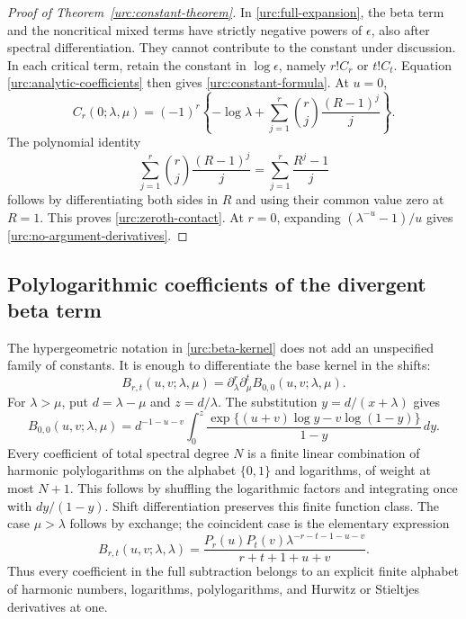\begin{proof}[Proof of Theorem~\ref{urc:constant-theorem}]
In \eqref{urc:full-expansion}, the beta term and the noncritical
mixed terms have strictly negative powers of $\epsilon$, also
after spectral differentiation. They cannot contribute to the
constant under discussion. In each critical term, retain the
constant in $\log\epsilon$, namely $r!C_r$ or $t!C_t$.
Equation \eqref{urc:analytic-coefficients} then gives
\eqref{urc:constant-formula}. At $u=0$,
\[
 C_r(0;\lambda,\mu)=(-1)^r\left\{-\log\lambda+
       \sum_{j=1}^r\binom rj\frac{(R-1)^j}{j}\right\}.
\]
The polynomial identity
\[
 \sum_{j=1}^r\binom rj\frac{(R-1)^j}{j}
       =\sum_{j=1}^r\frac{R^j-1}{j}
\]
follows by differentiating both sides in $R$ and using their common
value zero at $R=1$. This proves \eqref{urc:zeroth-contact}.
At $r=0$, expanding $(\lambda^{-u}-1)/u$ gives
\eqref{urc:no-argument-derivatives}.
\end{proof}

\subsection{Polylogarithmic coefficients of the divergent beta term}

The hypergeometric notation in \eqref{urc:beta-kernel} does not add
an unspecified family of constants. It is enough to differentiate
the base kernel in the shifts:
\[
 B_{r,t}(u,v;\lambda,\mu)
       =\partial_\lambda^r\partial_\mu^t
                      B_{0,0}(u,v;\lambda,\mu).
\]
For $\lambda>\mu$, put $d=\lambda-\mu$ and $z=d/\lambda$.
The substitution $y=d/(x+\lambda)$ gives
\begin{equation}\label{urc:polylog-beta}
 B_{0,0}(u,v;\lambda,\mu)
  =d^{-1-u-v}\int_0^z
       \frac{\exp\{(u+v)\log y-v\log(1-y)\}}{1-y}\,dy.
\end{equation}
Every coefficient of total spectral degree $N$ is a finite linear
combination of harmonic polylogarithms on the alphabet $\{0,1\}$
and logarithms, of weight at most $N+1$. This follows by shuffling
the logarithmic factors and integrating once with $dy/(1-y)$.
Shift differentiation preserves this finite function class. The
case $\mu>\lambda$ follows by exchange; the coincident case is
the elementary expression
\[
 B_{r,t}(u,v;\lambda,\lambda)
 =\frac{P_r(u)P_t(v)\lambda^{-r-t-1-u-v}}{r+t+1+u+v}.
\]
Thus every coefficient in the full subtraction belongs to an
explicit finite alphabet of harmonic numbers, logarithms,
polylogarithms, and Hurwitz or Stieltjes derivatives at one.

